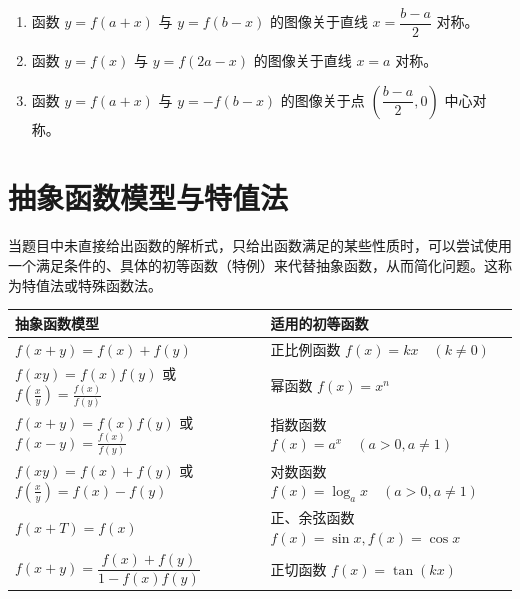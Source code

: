 \begin{theorem}[函数图像变换与对称性]
    \begin{enumerate}
        \item 函数 $y=f(a+x)$ 与 $y=f(b-x)$ 的图像关于直线 $x = \dfrac{b-a}{2}$ 对称。
        \item 函数 $y=f(x)$ 与 $y=f(2a-x)$ 的图像关于直线 $x=a$ 对称。
        \item 函数 $y=f(a+x)$ 与 $y=-f(b-x)$ 的图像关于点 $(\dfrac{b-a}{2}, 0)$ 中心对称。
    \end{enumerate}
\end{theorem}

\section{抽象函数模型与特值法}

\begin{theorem}[常见抽象函数模型]
    当题目中未直接给出函数的解析式，只给出函数满足的某些性质时，可以尝试使用一个满足条件的、具体的初等函数（特例）来代替抽象函数，从而简化问题。这称为特值法或特殊函数法。
    \begin{center}
        \begin{tabular}{|l|l|}
            \hline
            \textbf{抽象函数模型}                                           & \textbf{适用的初等函数}                             \\
            \hline
            $f(x+y) = f(x) + f(y)$                                    & 正比例函数 $f(x) = kx \quad (k \neq 0)$           \\
            \hline
            $f(xy) = f(x)f(y)$ 或 $f(\frac{x}{y}) = \frac{f(x)}{f(y)}$ & 幂函数 $f(x) = x^n$                             \\
            \hline
            $f(x+y) = f(x)f(y)$ 或 $f(x-y) = \frac{f(x)}{f(y)}$        & 指数函数 $f(x) = a^x \quad (a>0, a \neq 1)$      \\
            \hline
            $f(xy) = f(x) + f(y)$ 或 $f(\frac{x}{y}) = f(x) - f(y)$    & 对数函数 $f(x) = \log_a x \quad (a>0, a \neq 1)$ \\
            \hline
            $f(x+T) = f(x)$                                           & 正、余弦函数 $f(x) = \sin x, f(x) = \cos x$        \\
            \hline
            $f(x+y) = \dfrac{f(x)+f(y)}{1-f(x)f(y)}$                  & 正切函数 $f(x) = \tan(kx)$                       \\
            \hline
        \end{tabular}
    \end{center}
\end{theorem}

